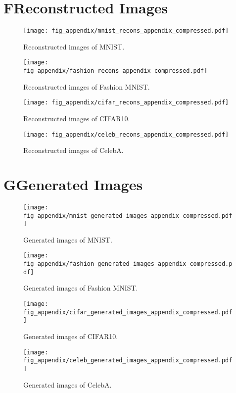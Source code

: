 \documentclass[letterpaper]{article} %
\begin{document}
\clearpage
\onecolumn
\section{F\quad Reconstructed Images}

\begin{figure*}[ht]
 \centering
 \texttt{[image: fig\_appendix/mnist\_recons\_appendix\_compressed.pdf]}
  \caption{Reconstructed images of MNIST.}
  \label{fig:mnist_recons}
\end{figure*}

\begin{figure*}[b!]
 \centering
 \texttt{[image: fig\_appendix/fashion\_recons\_appendix\_compressed.pdf]}
  \caption{Reconstructed  images of Fashion MNIST.}
  \label{fig:fashion_recons}
\end{figure*}

\begin{figure*}[ht]
 \centering
 \texttt{[image: fig\_appendix/cifar\_recons\_appendix\_compressed.pdf]}
  \caption{Reconstructed  images of CIFAR10.}
  \label{fig:cifar_recons}
\end{figure*}

\begin{figure*}[b!]
 \centering
 \texttt{[image: fig\_appendix/celeb\_recons\_appendix\_compressed.pdf]}
  \caption{Reconstructed  images of CelebA.}
  \label{fig:celeb_recons}
\end{figure*}


\clearpage
\onecolumn
\section{G\quad Generated Images}


\begin{figure*}[ht]
 \centering
 \texttt{[image: fig\_appendix/mnist\_generated\_images\_appendix\_compressed.pdf]}
  \caption{Generated images of MNIST.}
  \label{fig:mnist_gen}
\end{figure*}

\begin{figure*}[b!]
 \centering
 \texttt{[image: fig\_appendix/fashion\_generated\_images\_appendix\_compressed.pdf]}
  \caption{Generated images of Fashion MNIST.}
  \label{fig:fashion_gen}
\end{figure*}

\begin{figure*}[ht]
 \centering
 \texttt{[image: fig\_appendix/cifar\_generated\_images\_appendix\_compressed.pdf]}
  \caption{Generated images of CIFAR10.}
  \label{fig:cifar_gen}
\end{figure*}

\begin{figure*}[b!]
 \centering
 \texttt{[image: fig\_appendix/celeb\_generated\_images\_appendix\_compressed.pdf]}
  \caption{Generated images of CelebA.}
  \label{fig:celeb_gen}
\end{figure*}
\end{document}
